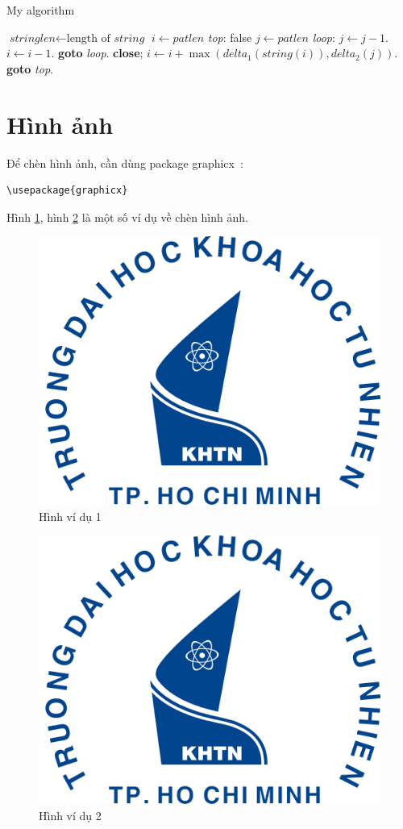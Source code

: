 \begin{algorithm}
\caption{My algorithm}\label{euclid}
\begin{algorithmic}[1]
\State $\textit{stringlen} \gets \text{length of }\textit{string}$
\State $i \gets \textit{patlen}$
\BState \emph{top}:
 \Return false
\EndIf
\State $j \gets \textit{patlen}$
\BState \emph{loop}:
\State $j \gets j-1$.
\State $i \gets i-1$.
\State \textbf{goto} \emph{loop}.
\State \textbf{close};
\EndIf
\State $i \gets i+\max(\textit{delta}_1(\textit{string}(i)),\textit{delta}_2(j))$.
\State \textbf{goto} \emph{top}.
\EndProcedure
\end{algorithmic}
\end{algorithm}

\section{Hình ảnh}

Để chèn hình ảnh, cần dùng package graphicx~\cite{Figures}:

\begin{lstlisting}
\usepackage{graphicx}
\end{lstlisting}

Hình \ref{fig:vd1}, hình \ref{fig:vd2} là một số ví dụ về chèn hình ảnh.

\begin{figure}[htp]
\centering
\includegraphics[width=6 cm]{images/logo-khtn.png}
\caption{Hình ví dụ 1}
\label{fig:vd1}
\end{figure}

\begin{figure}[htp]
\centering
\includegraphics[width=40 mm]{images/logo-khtn.png}
\caption{Hình ví dụ 2}
\label{fig:vd2}
\end{figure}


